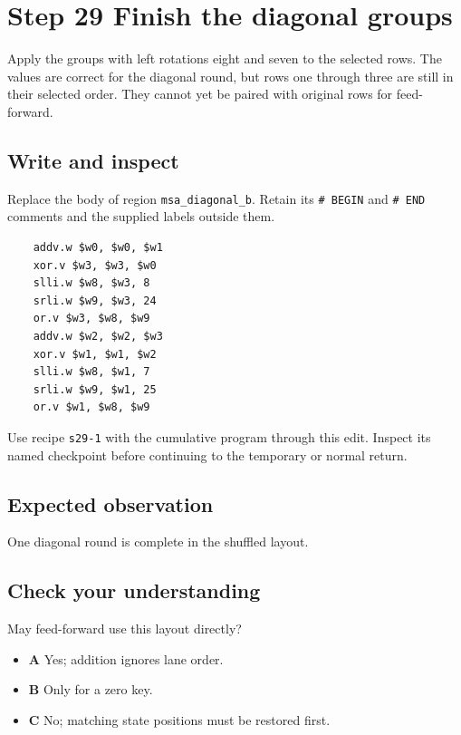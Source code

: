 \section{Step 29 Finish the diagonal groups}\label{chacha-s29}

Apply the groups with left rotations eight and seven to the selected rows. The values are correct for the diagonal round, but rows one through three are still in their selected order. They cannot yet be paired with original rows for feed-forward.

\subsection{Write and inspect}
Replace the body of region \texttt{msa\_diagonal\_b}. Retain its \texttt{\# BEGIN} and \texttt{\# END} comments and the supplied labels outside them.

\begin{verbatim}
    addv.w $w0, $w0, $w1
    xor.v $w3, $w3, $w0
    slli.w $w8, $w3, 8
    srli.w $w9, $w3, 24
    or.v $w3, $w8, $w9
    addv.w $w2, $w2, $w3
    xor.v $w1, $w1, $w2
    slli.w $w8, $w1, 7
    srli.w $w9, $w1, 25
    or.v $w1, $w8, $w9
\end{verbatim}

Use recipe \texttt{s29-1} with the cumulative program through this edit. Inspect its named checkpoint before continuing to the temporary or normal return.

\subsection{Expected observation}
One diagonal round is complete in the shuffled layout.

\subsection{Check your understanding}
May feed-forward use this layout directly?

\begin{itemize}
  \item \textbf{A} Yes; addition ignores lane order.
  \item \textbf{B} Only for a zero key.
  \item \textbf{C} No; matching state positions must be restored first.
\end{itemize}
